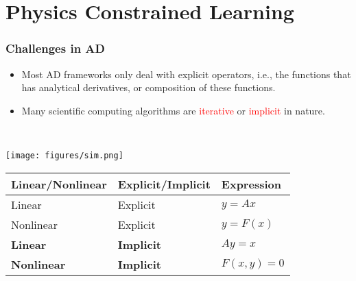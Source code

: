 \documentclass[usenames,dvipsnames]{beamer}
\begin{document}


\section{Physics Constrained Learning}
\begin{frame}


	\frametitle{Challenges in AD}
	
	
	\begin{minipage}[t]{0.49\textwidth}
	\vspace{-3cm}
\begin{itemize}
	\item Most AD frameworks only deal with explicit operators, i.e., the functions that has analytical derivatives, or composition of these functions. 
	\item Many scientific computing algorithms are \textcolor{red}{iterative} or \textcolor{red}{implicit} in nature.
\end{itemize}
\end{minipage}~
\begin{minipage}[t]{0.49\textwidth}
  \texttt{[image: figures/sim.png]}
\end{minipage}

\begin{table}[]
\begin{tabular}{@{}lll@{}}
\toprule
Linear/Nonlinear & Explicit/Implicit & Expression   \\ \midrule
Linear           & Explicit          & $y=Ax$       \\
Nonlinear        & Explicit          & $y = F(x)$   \\
\textbf{Linear}           & \textbf{Implicit}          & $Ay = x$     \\
\textbf{Nonlinear}        & \textbf{Implicit}          & $F(x,y) = 0$ \\ \bottomrule
\end{tabular}
\end{table}
\end{frame}
\end{document}
